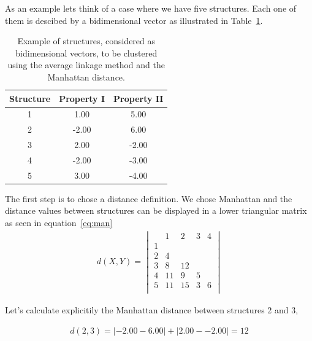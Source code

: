 As an example lets think of a case where we have five structures. Each one
of them is descibed by a bidimensional vector as illustrated in
Table~\ref{tab:data}.
\begin{table}
\centering
\begin{tabular}[h]{|c|c|c|}
\hline
Structure & Property I & Property II\\
\hline\hline
1  &     1.00  &  5.00 \\
\hline
2  &    -2.00  & 6.00 \\
\hline
3  &      2.00  & -2.00 \\
\hline
4  &     -2.00  & -3.00 \\
\hline
5  &     3.00  &  -4.00 \\
\hline
\end{tabular}
\caption{Example of structures, considered as bidimensional vectors, to be
clustered using the average linkage method and the Manhattan distance.}
\label{tab:data}
\end{table}

The first step is to chose a distance definition. We chose Manhattan and the
distance values between structures can be displayed in a lower triangular
matrix as seen in equation~\ref{eq:man}
\begin{gather} 
d(X, Y)=
\begin{vmatrix}
    & 1  &  2   & 3 & 4 \\
1  &     &       &    &     \\
2  & 4  &       &    &     \\
3  & 8  & 12 &    &      \\
4  & 11 &  9  & 5 &      \\
5  & 11 & 15 & 3 & 6 \\
\end{vmatrix}
\label{eq:man}
\end{gather}

Let's calculate explicitily the Manhattan distance between structures 2 and 3,

\begin{gather}
d(2, 3)= |-2.00 - 6.00| + |2.00 - -2.00| = 12
\end{gather}

